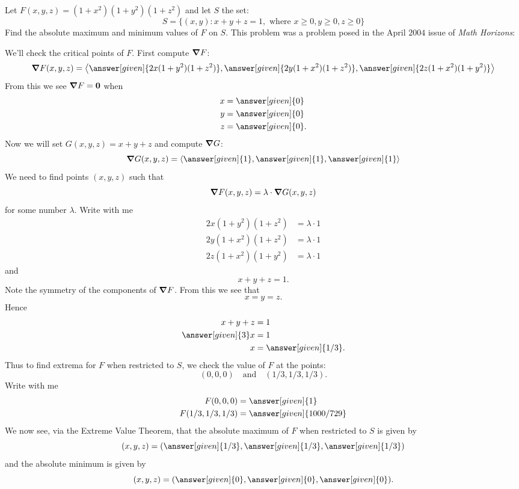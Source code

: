 \documentclass{ximera}
\begin{document}
\begin{example}
  Let $F(x,y,z) = (1+x^2)(1+y^2)(1+z^2)$ and let $S$ the set:
  \[
  S = \{(x,y):x+y+z=1,\text{ where }x\ge 0, y\ge 0,z\ge 0\}
  \]
  Find the absolute maximum and minimum values of $F$ on $S$. This
  problem was a problem posed in the April $2004$ issue of \textit{Math
    Horizons}:
  \begin{explanation}
    We'll check the critical points of $F$. First compute $\boldsymbol\nabla F$:
    \[
    \grad F(x,y,z) = \vector{\answer[given]{2x(1+y^2)(1+z^2)},\answer[given]{2y(1+x^2)(1+z^2)},\answer[given]{2z(1+x^2)(1+y^2)}} 
    \]
    From this we see $\boldsymbol\nabla F = \mathbf{0}$ when
    \begin{align*}
      x &= \answer[given]{0}\\
      y &= \answer[given]{0}\\
      z &= \answer[given]{0}.
    \end{align*}
    Now we will set $G(x,y,z) = x+y+z$ and compute $\boldsymbol\nabla G$:
    \[
    \grad G(x,y,z) = \vector{\answer[given]{1},\answer[given]{1},\answer[given]{1}}
    \]
    We need to find points $(x,y,z)$ such that
    \[
    \boldsymbol\nabla F(x,y,z) = \lambda \cdot \boldsymbol\nabla G(x,y,z)
    \]
    for some number $\lambda$. Write with me
    \begin{align*}
      2x(1+y^2)(1+z^2) &=\lambda \cdot 1\\
      2y(1+x^2)(1+z^2) &=\lambda \cdot 1\\
      2z(1+x^2)(1+y^2) &=\lambda \cdot 1
    \end{align*}
    and
    \[
    x+y+z=1.
    \]
    Note the symmetry of the components of $\boldsymbol\nabla F$. From this we see that
    \[
    x = y = z.
    \]
    Hence
    \begin{align*}
    x+y+z&=1\\
    \answer[given]{3}x &= 1\\
    x &= \answer[given]{1/3}.
    \end{align*}
    Thus to find extrema for $F$ when restricted to $S$, we check the
    value of $F$ at the points:
    \[
    (0,0,0)\quad\text{and}\quad(1/3,1/3,1/3).
    \]
    Write with me
    \begin{align*}
      F(0,0,0) &= \answer[given]{1}\\
      F(1/3,1/3,1/3) &= \answer[given]{1000/729}
    \end{align*}
    We now see, via the Extreme Value Theorem, that the absolute
    maximum of $F$ when restricted to $S$ is given by
    \[
    (x,y,z) = (\answer[given]{1/3},\answer[given]{1/3},\answer[given]{1/3})
    \]
    and the absolute minimum is given by
    \[
    (x,y,z) = (\answer[given]{0},\answer[given]{0},\answer[given]{0}).
    \]
  \end{explanation}
\end{example}
\end{document}
